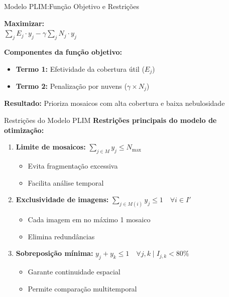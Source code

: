 \documentclass[aspectratio=169,11pt]{beamer}
\begin{document}
\begin{frame}{Modelo PLIM:\@ Função Objetivo e Restrições}
\vspace{-1.0cm}
\begin{center}
    \colorbox{ufal!10}{\parbox{8cm}{\centering
        \textbf{Maximizar:}\\[0.2cm]
        {\Large $\sum_j E_j \cdot y_j - \gamma \sum_j N_j \cdot y_j$}
    }}
\end{center}

\vspace{0.3cm}
\textbf{Componentes da função objetivo:}
\begin{itemize}
    \item \textbf{Termo 1:} Efetividade da cobertura útil ($E_j$)
    \item \textbf{Termo 2:} Penalização por nuvens ($\gamma \times N_j$)
\end{itemize}

\vspace{0.2cm}
\footnotesize\textbf{Resultado:} Prioriza mosaicos com alta cobertura e baixa nebulosidade
\end{frame}

\begin{frame}{Restrições do Modelo PLIM}
\vspace{-0.2cm}
\textbf{Restrições principais do modelo de otimização:}

\begin{enumerate}
    \item \textbf{Limite de mosaicos:} $\sum_{j \in M} y_j \leq N_{\max}$
    \begin{itemize}
        \item Evita fragmentação excessiva
        \item Facilita análise temporal
    \end{itemize}
    
    \item \textbf{Exclusividade de imagens:} $\sum_{j \in M(i)} y_j \leq 1 \quad \forall i \in I'$
    \begin{itemize}
        \item Cada imagem em no máximo 1 mosaico
        \item Elimina redundâncias
    \end{itemize}
    
    \item \textbf{Sobreposição mínima:} $y_j + y_k \leq 1 \quad \forall j,k \mid I_{j,k} < 80\%$
    \begin{itemize}
        \item Garante continuidade espacial
        \item Permite comparação multitemporal
    \end{itemize}
\end{enumerate}
\end{frame}
\end{document}
